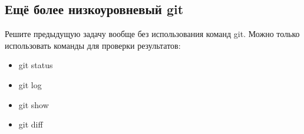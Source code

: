 \documentclass{article}
\begin{document}
\subsection{Ещё более низкоуровневый git}
Решите предыдущую задачу вообще без использования команд git. Можно только использовать команды для проверки результатов:
\begin{itemize}
\item git status
\item git log
\item git show
\item git diff
\end{itemize}







\iffalse
\section*{Необязательные задачи (не будут учитываться при оценивании)}
\fi
\end{document}
